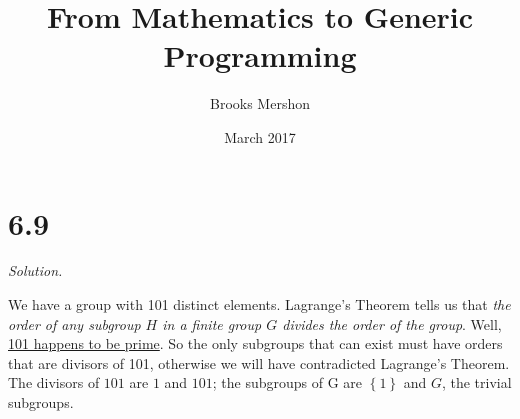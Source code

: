 \documentclass{article}
\title{From Mathematics to Generic Programming}
\author{Brooks Mershon}
\date{March 2017}
\begin{document}
\maketitle

\section*{6.9}

\textit{Solution.}

We have a group with 101 distinct elements. Lagrange's Theorem tells us that \textit{the order of any subgroup $H$ in a finite group $G$ divides the order of the group}. Well, \href{https://bl.ocks.org/bmershon/8bed98a4633d86403e1ca56165cda6da}{101 happens to be prime}. So the only subgroups that can exist must have orders that are divisors of 101, otherwise we will have contradicted Lagrange's Theorem. The divisors of $101$ are $1$ and $101$; the subgroups of G are $\left\{ 1 \right\}$ and $G$, the trivial subgroups.
\end{document}
